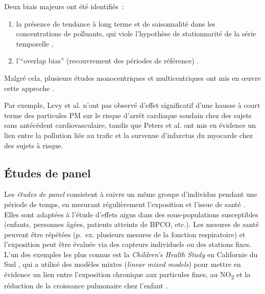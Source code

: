 Deux biais majeurs ont été identifiés : 

\begin{enumerate}
	\item la présence de tendance à long terme et de saisonnalité dans les concentrations de polluants, qui viole l’hypothèse de stationnarité de la série temporelle \citep{Navidi1998,BatesonSchwartz1999,LumleyLevy2000,BatesonSchwartz2001,LevyLumleySheppard2001},
	\item l’``overlap bias'' (recouvrement des périodes de référence) \citep{AustinFlandersRothman1989,LumleyLevy2000,JanesSheppardLumley2005a,JanesSheppardLumley2005b}. 
\end{enumerate}

Malgré cela, plusieurs études monocentriques et multicentriques ont mis en œuvre cette approche \citep{SchwartzLee1999,NeasSchwartzDockery1999,PetersDockeryMuller2001,LevySheppardCheckoway2001,D'IppolitiForastiereAncona2003,SymonsWangGuallar2006,ZanobettiSchwartz2005,BarnettWilliamsSchwartz2005,BarnettWilliamsSchwartz2006,MedinaRamónZanobetti2006}.

Par exemple, Levy et al. \citep{LevySheppardCheckoway2001} n’ont pas observé d’effet significatif d’une hausse à court terme des particules PM sur le risque d’arrêt cardiaque soudain chez des sujets sans antécédent cardiovasculaire, tandis que Peters et al. \citep{PetersKlotzHeier2004} ont mis en évidence un lien entre la pollution liée au trafic et la survenue d’infarctus du myocarde chez des sujets à risque.

\subsection{Études de panel}
Les \emph{études de panel} consistent à suivre un même groupe d’individus pendant une période de temps, en mesurant régulièrement l’exposition et l’issue de santé \citep{PetersAvolGauderman1999,PetersAvolNavidi1999,GaudermanMcConnellGilliland2000}. Elles sont adaptées à l’étude d’effets aigus dans des sous-populations susceptibles (enfants, personnes âgées, patients atteints de BPCO, etc.). Les mesures de santé peuvent être répétées (p.~ex. plusieurs mesures de la fonction respiratoire) et l’exposition peut être évaluée via des capteurs individuels ou des stations fixes. L’un des exemples les plus connus est la \emph{Children’s Health Study} en Californie du Sud \citep{PetersAvolNavidi1999,PetersAvolGauderman1999,GaudermanMcConnellGilliland2000}, qui a utilisé des modèles mixtes (\emph{linear mixed models}) pour mettre en évidence un lien entre l’exposition chronique aux particules fines, au NO\textsubscript{2} et la réduction de la croissance pulmonaire chez l’enfant \citep{GaudermanMcConnellGilliland2000}.


